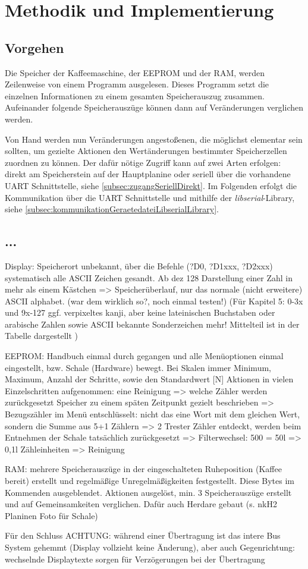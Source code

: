 \chapter{Methodik und Implementierung}

\section{Vorgehen}
Die Speicher der Kaffeemaschine, der \ac{EEPROM} und der \ac{RAM}, werden Zeilenweise von einem Programm ausgelesen.
Dieses Programm setzt die einzelnen Informationen zu einem gesamten Speicherauszug zusammen.
Aufeinander folgende Speicherauszüge können dann auf Veränderungen verglichen werden.


Von Hand werden nun Veränderungen angestoßenen, die möglichst elementar sein sollten, um gezielte Aktionen den Wertänderungen bestimmter Speicherzellen zuordnen zu können.
Der dafür nötige Zugriff kann auf zwei Arten erfolgen: direkt am Speicherstein auf der Hauptplanine oder seriell über die vorhandene \ac{UART} Schnittstelle, siehe \ref{subsec:zugangSeriellDirekt}.
Im Folgenden erfolgt die Kommunikation über die \ac{UART} Schnittstelle und mithilfe der \textit{libserial}-Library, siehe \ref{subsec:kommunikationGeraetedateiLibserialLibrary}.

\section{...}

Display: Speicherort unbekannt, über die Befehle (?D0, ?D1xxx, ?D2xxx) systematisch alle ASCII Zeichen gesandt.
Ab dez 128 Darstellung einer Zahl in mehr als einem Kästchen => Speicherüberlauf, nur das normale (nicht erweitere) ASCII alphabet. (war dem wirklich so?, noch einmal testen!)
(Für Kapitel 5: 0-3x und 9x-127 ggf. verpixeltes kanji, aber keine lateinischen Buchstaben oder arabische Zahlen sowie ASCII bekannte Sonderzeichen mehr! Mittelteil ist in der Tabelle dargestellt )

EEPROM: Handbuch einmal durch gegangen und alle Menüoptionen einmal eingestellt, bzw. Schale (Hardware) bewegt.
Bei Skalen immer Minimum, Maximum, Anzahl der Schritte, sowie den Standardwert [N]
Aktionen in vielen Einzelschritten aufgenommen: eine Reinigung => welche Zähler werden zurückgesetzt
Speicher zu einem späten Zeitpunkt gezielt beschrieben
  => Bezugszähler im Menü entschlüsselt: nicht das eine Wort mit dem gleichen Wert, sondern die Summe aus 5+1 Zählern
  => 2 Trester Zähler entdeckt, werden beim Entnehmen der Schale tatsächlich zurückgesetzt
  => Filterwechsel: 500 = 50l => 0,1l Zähleinheiten
  => Reinigung

RAM: mehrere Speicherauszüge in der eingeschalteten Ruheposition (Kaffee bereit) erstellt und regelmäßige Unregelmäßigkeiten festgestellt. Diese Bytes im Kommenden ausgeblendet.
Aktionen ausgelöst, min. 3 Speicherauszüge erstellt und auf Gemeinsamkeiten verglichen.
  Dafür auch Herdare gebaut (s. nkH2 Planinen Foto für Schale)

Für den Schluss
ACHTUNG: während einer Übertragung ist das intere Bus System gehemmt (Display vollzieht keine Änderung), aber auch Gegenrichtung: wechselnde Displaytexte sorgen für Verzögerungen bei der Übertragung

